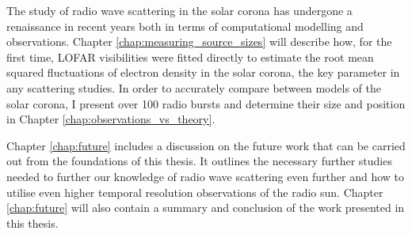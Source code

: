 The study of radio wave scattering in the solar corona has undergone a renaissance in recent years both in terms of computational modelling and observations. Chapter \ref{chap:measuring_source_sizes} will describe how, for the first time, LOFAR visibilities were fitted directly to estimate the root mean squared fluctuations of electron density in the solar corona, the key parameter in any scattering studies. In order to accurately compare between models of the solar corona, I present over 100 radio bursts and determine their size and position in Chapter \ref{chap:observations_vs_theory}.

Chapter \ref{chap:future} includes a discussion on the future work that can be carried out from the foundations of this thesis. It outlines the necessary further studies needed to further our knowledge of radio wave scattering even further and how to utilise even higher temporal resolution observations of the radio sun. Chapter \ref{chap:future} will also contain a summary and conclusion of the work presented in this thesis.










































